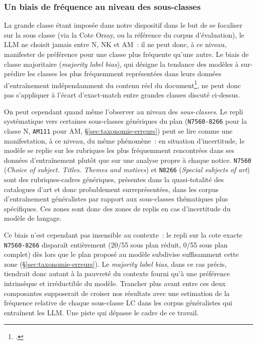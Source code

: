 \subsubsection*{Un biais de fréquence au niveau des sous-classes}

La grande classe étant imposée dans notre dispositif dans le but de se focaliser sur la sous classe (via la Cote Orsay, ou la référence du corpus d'évaluation), le LLM ne choisit jamais entre N, NK et AM~: il ne peut donc, à ce niveau, manifester de préférence pour une classe plus fréquente qu'une autre. Le biais de classe majoritaire (\textit{majority label bias}), qui désigne la tendance des modèles à sur-prédire les classes les plus fréquemment représentées dans leurs données d'entraînement indépendamment du contenu réel du document\footcite{zhao2021}, ne peut donc pas s'appliquer à l'écart d'exact-match entre grandes classes discuté ci-dessus.

On peut cependant quand même l’observer au niveau des \emph{sous-classes}. Le repli systématique vers certaines sous-classes génériques du plan (\texttt{N7560-8266} pour la classe N, \texttt{AM111} pour AM, \S\ref{sec:taxonomie-erreurs}) peut se lire comme une manifestation, à ce niveau, du même phénomène~: en situation d'incertitude, le modèle se replie sur les rubriques les plus fréquemment rencontrées dans ses données d'entraînement plutôt que sur une analyse propre à chaque notice. \texttt{N7560} (\textit{Choice of subject. Titles. Themes and motives}) et \texttt{N8266} (\textit{Special subjects of art}) sont des rubriques-cadres génériques, présentes dans la quasi-totalité des catalogues d'art et donc probablement surreprésentées, dans les corpus d'entraînement généralistes par rapport aux sous-classes thématiques plus spécifiques. Ces zones sont donc des zones de replis en cas d'incertitude du modèle de langage.  


Ce biais n'est cependant pas insensible au contexte~: le repli sur la cote exacte \texttt{N7560-8266} disparaît entièrement (20/55 sous plan réduit, 0/55 sous plan complet) dès lors que le plan proposé au modèle subdivise suffisamment cette zone (\S\ref{sec:taxonomie-erreurs}). Le \textit{majority label bias}, dans ce cas précis, tiendrait donc autant à la pauvreté du contexte fourni qu'à une préférence intrinsèque et irréductible du modèle. Trancher plus avant entre ces deux composantes supposerait de croiser nos résultats avec une estimation de la fréquence relative de chaque sous-classe LC dans les corpus généralistes qui entraînent les LLM. Une piste qui dépasse le cadre de ce travail.

